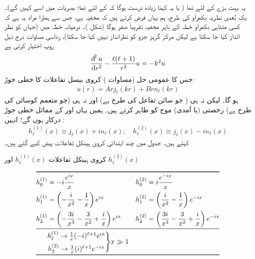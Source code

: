 یہ بہت بڑے   کے لئے تھا ( یا یہ کہنا زیادہ درست ہوگا کہ  کے لئے تھا؛    بصریات میں اسے    کہیں گے)۔ یک بُعدی نظریہ بکھراو کی طرح،  ہم یہاں فرض کرتے ہیں کہ مخفیہ   ہے،  جس سے  ہمارا مراد یہ ہے کہ کسی متناہی بکھراو خطہ کے باہر  مخفیہ  تقریباً صفر ہوگا  (شکل )۔ درمیانہ  خطہ میں (جہاں  کو  نظر انداز  کیا جا سکتا ہے لیکن مرکز گریز جزو کو نظرانداز نہیں کیا جا سکتا)،   رداسی مساوات درج ذیل روپ اختیار کرتی ہے
\begin{align}
	\frac{\dif^2u}{\dif r^2}-\frac{\ell(\ell+1)}{r^2}u = -k^2u
\end{align}
جس کا عمومی حل (مساوات )   کروی بیسل تفاعلات کا خطی جوڑ:
\begin{align}
	u(r) = Arj_{\ell}(kr)+Brn_{\ell}(kr)
\end{align}
ہو گا۔ لیکن نہ ہی  ( جو سائن تفاعل کی طرح ہے)  اور نہ ہی  (جو متعمم کوسائن کی طرح ہے)   رخصتی (یا آمدی) موج کو ظاہر  کرتے ہیں۔ ہمیں یہاں  اور   کے مماثل   خطی جوڑ درکار ہوں گے؛  انہیں :
\begin{align}
	h^{(1)}_{\ell}(x)\equiv j_{\ell}(x)+in_{\ell}(x);\quad h^{(2)}_{\ell}(x)\equiv j_{\ell}(x)-in_{\ell}(x)
\end{align}
  کہتے ہیں۔ جدول    میں چند ابتدائی کروی ہینکل تفاعلات پیش کیے  گئے ہیں۔
\begin{table}[h!]
\centering
\caption{کروی ہینکل تفاعلات $h_{\ell}^{(1)}(x)$ اور $h_{\ell}^{(2)}(x)$}
\label{جدول_بکھراو_ہینکل_تفاعلات}
\begin{align*}
\toprule
h_0^{(1)}& = -i\frac{e^{ix}}{x} & & h_0^{(2)} = i\frac{e^{-ix}}{x} \\
h_1^{(1)} &= \left(-\frac{i}{x^2}-\frac{1}{x}\right)e^{ix} & & h_1^{(2)} = \left(\frac{i}{x^2}-\frac{1}{x}\right)e^{-ix} \\
h_2^{(1)} &= \left(-\frac{3i}{x^3}-\frac{3}{x^2}+\frac{i}{x}\right)e^{ix} & & h_2^{(2)} = \left(\frac{3i}{x^3}-\frac{3}{x^2}+\frac{i}{x}\right)e^{-ix}\\
\midrule
&\begin{matrix}
 	h_{\ell}^{(1)}\rightarrow\frac{1}{x}(-i)^{\ell+1}e^{ix} \\[0.5em]
 	h_2^{(2)}\rightarrow\frac{1}{x}(i)^{\ell+1}e^{-ix}
 \end{matrix}
	\Bigg\}x \gg 1\\
\bottomrule
\end{align*}
\end{table}
